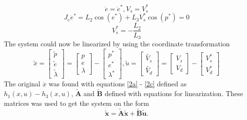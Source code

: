 \begin{equation*}
    \ddot{e} = \ddot{e}^*, V_s = V_s^*
\end{equation*}
\begin{equation*}
    J_e \ddot{e}^* = L_2 \cos(e^*) + L_3 V_s^* \cos(p^*) = 0
\end{equation*}
\begin{equation}\label{eq:Vsstar}
    V_s^* = - \frac{L_2}{L_3}
\end{equation}
The system could now be linearized by using the coordinate transformation
\begin{equation*}
    \tilde{x} =
    \begin{bmatrix}
        \tilde{p}\\ \tilde{e}\\ \tilde{\lambda}
    \end{bmatrix}
    =
    \begin{bmatrix}
        p\\ e\\ \lambda
    \end{bmatrix}
    -
    \begin{bmatrix}
        p^*\\ e^*\\ \lambda^*
    \end{bmatrix},
    \tilde{u} =
    \begin{bmatrix}
        \tilde{V_s}\\ \tilde{V_d}
    \end{bmatrix}
    =
    \begin{bmatrix}
        V_s\\ V_d
    \end{bmatrix}
    -
    \begin{bmatrix}
        V_s^*\\ V_d^*
    \end{bmatrix}
\end{equation*}
The original $\dot{x}$ was found with equations \eqref{2a} - \eqref{2c} defined as $h_1(x,u) - h_3(x,u)$, $\tilde{\textbf{A}}$ and $\tilde{\textbf{B}}$ defined with equations for linearization. These matrices was used to get the system on the form
\begin{equation*}
\dot{\tilde{\textbf{x}}} = {\tilde{\textbf{A}} \tilde{\textbf{x}}} + {\tilde{\textbf{B}} \tilde{\textbf{u}}}.
\end{equation*}

